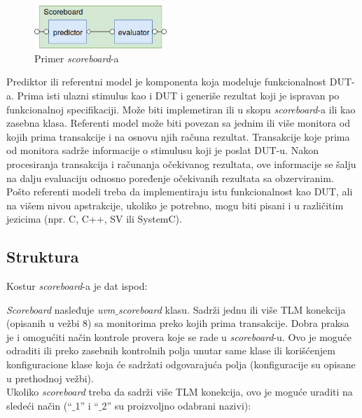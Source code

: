\begin{figure}[h!]
  \center
  \includegraphics[width=50mm, scale=0.5]{img/v10_scoreboard.png}
  \caption{Primer \emph{scoreboard}-a}
  \label{fig:scoreboard}
\end{figure}

Prediktor ili referentni model je komponenta koja modeluje funkcionalnost DUT-a.
Prima isti ulazni stimulus kao i DUT i generiše rezultat koji je ispravan po
funkcionalnoj specifikaciji. Može biti implemetiran ili u skopu
\emph{scoreboard}-a ili kao zasebna klasa. Referenti model može biti povezan sa
jednim ili više monitora od kojih prima transakcije i na osnovu njih računa
rezultat. Transakcije koje prima od monitora sadrže informacije o stimulusu koji
je poslat DUT-u. Nakon procesiranja transakcija i računanja očekivanog
rezultata, ove informacije se šalju na dalju evaluaciju odnosno poređenje
očekivanih rezultata sa obzerviranim. Pošto referenti modeli treba da
implementiraju istu funkcionalnost kao DUT, ali na višem nivou apstrakcije,
ukoliko je potrebno, mogu biti pisani i u različitim jezicima (npr. C, C++, SV
ili SystemC).


\subsection{Struktura}

Kostur \emph{scoreboard}-a je dat ispod:



\emph{Scoreboard} nasleđuje \emph{uvm\(\_\)scoreboard} klasu. Sadrži jednu ili
više TLM konekcija (opisanih u vežbi 8) sa monitorima preko kojih prima
transakcije. Dobra praksa je i omogućiti način kontrole provera koje se rade u
\emph{scoreboard}-u. Ovo je moguće odraditi ili preko zasebnih kontrolnih polja
unutar same klase ili korišćenjem konfiguracione klase koja će sadržati
odgovarajuća polja (konfiguracije su opisane u prethodnoj vežbi).\\

Ukoliko \emph{scoreboard} treba da sadrži više TLM konekcija, ovo je moguće
uraditi na sledeći način (``\(\_\)1'' i ``\(\_\)2'' su proizvoljno odabrani
nazivi):

